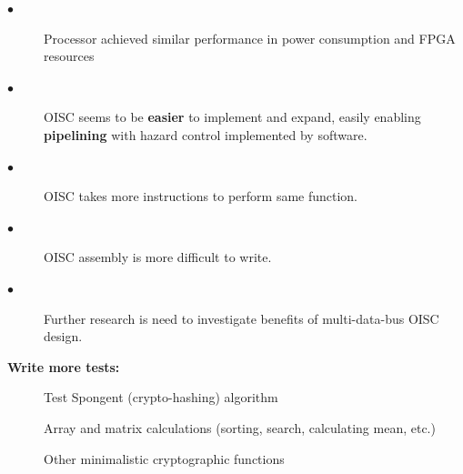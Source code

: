 \documentclass[portrait,color=UCLmidgreen,margin=1.5cm,bannerheight=8cm,logoheight=2.5cm]{uclposter}
\begin{document}
\begin{tcolorbox}[title=Results]
%	
\end{tcolorbox}

\begin{Row}\begin{Cell}{1}

\begin{tcolorbox}[title=Conclusion]
	\begin{description}
		\item[$\bullet$] Processor achieved similar performance in power consumption and FPGA resources
		\item[$\bullet$] OISC seems to be \textbf{easier} to implement and expand, easily enabling \textbf{pipelining} with hazard control implemented by software.
		\item[$\bullet$] OISC takes more instructions to perform same function.
		\item[$\bullet$] OISC assembly is more difficult to write.
		\item[$\bullet$] Further research is need to investigate benefits of multi-data-bus OISC design.
		\\[1mm]
	\end{description}
\end{tcolorbox}	

\end{Cell}\begin{Cell}{2}

\begin{tcolorbox}[title=Future work]
	\begin{multicols}{2}
		\textbf{Write more tests:}
		\begin{description}
			\item[\textendash] Test Spongent (crypto-hashing) algorithm
			\item[\textendash] Array and matrix calculations (sorting, search, calculating mean, etc.)
			\item[\textendash] Other minimalistic cryptographic functions
		\end{description}
	

\end{multicols}
\end{tcolorbox}
\end{Cell}
\end{Row}
\end{document}
